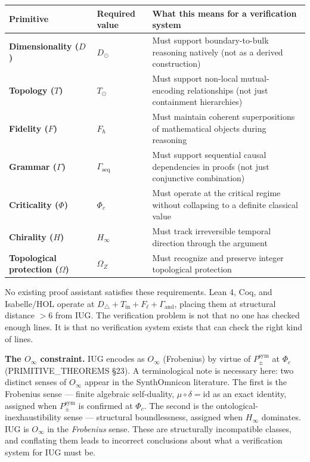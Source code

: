 \documentclass[10pt,a4paper]{article}
\newcommand{\pilcrow}{\S}
\begin{document}
\begin{table}[htbp]
\centering
\small
{}
\begin{tabularx}{\textwidth}{>{\centering\arraybackslash}X >{\centering\arraybackslash}X >{\centering\arraybackslash}X}
\toprule
\rowcolor{gray!25}\textbf{Primitive} & \textbf{Required value} & \textbf{What this means for a verification system} \\
\midrule
\rowcolors{1}{white}{gray!10}
\textbf{Dimensionality ($D$)} & $D_\odot$ & Must support boundary-to-bulk reasoning natively (not as a derived construction) \\
\textbf{Topology ($T$)} & $T_\odot$ & Must support non-local mutual-encoding relationships (not just containment hierarchies) \\
\textbf{Fidelity ($F$)} & $F_{\hbar}$ & Must maintain coherent superpositions of mathematical objects during reasoning \\
\textbf{Grammar ($\Gamma$)} & $\Gamma_\text{seq}$ & Must support sequential causal dependencies in proofs (not just conjunctive combination) \\
\textbf{Criticality ($\Phi$)} & $\Phi_c$ & Must operate at the critical regime without collapsing to a definite classical value \\
\textbf{Chirality ($H$)} & $H_{\infty}$ & Must track irreversible temporal direction through the argument \\
\textbf{Topological protection ($\Omega$)} & $\Omega_Z$ & Must recognize and preserve integer topological protection \\
\bottomrule
\end{tabularx}
\end{table}

No existing proof assistant satisfies these requirements. Lean 4, Coq, and Isabelle/HOL
operate at $D_{\triangle} + T_\text{in} + F_{\ell} + \Gamma_\text{and}$, placing them at
structural distance $> 6$ from IUG. The verification problem is not that no one has checked
enough lines. It is that no verification system exists that can check the right kind of
lines.

\textbf{The $O_{\infty}$ constraint.}
IUG encodes as $O_{\infty}$ (Frobenius) by virtue of $P_{\pm}^{\text{sym}}$ at $\Phi_c$
(PRIMITIVE\_THEOREMS \pilcrow{}23).
A terminological note is necessary here: two distinct senses of $O_\infty$ appear in the
SynthOmnicon literature.
The first is the Frobenius sense --- finite algebraic self-duality, $\mu \circ \delta = \text{id}$
as an exact identity, assigned when $P_{\pm}^{\text{sym}}$ is confirmed at $\Phi_c$.
The second is the ontological-inexhaustibility sense --- structural boundlessness,
assigned when $H_{\infty}$ dominates.
IUG is $O_{\infty}$ in the \emph{Frobenius} sense.
These are structurally incompatible classes, and conflating them leads to incorrect conclusions
about what a verification system for IUG must be.
\end{document}
